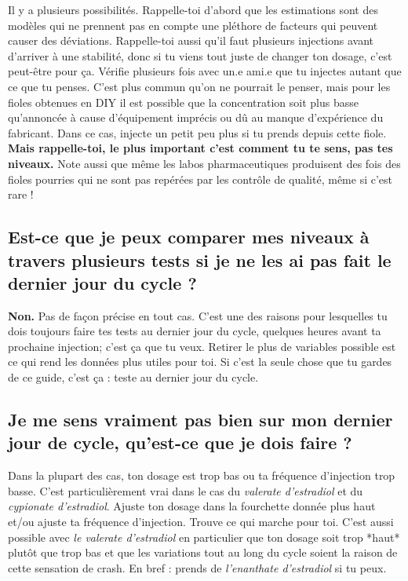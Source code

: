 \documentclass{article}
\begin{document}
Il y a plusieurs possibilités. Rappelle-toi d'abord que les estimations sont des modèles qui ne prennent pas en compte une pléthore de facteurs qui peuvent causer des déviations. Rappelle-toi aussi qu'il faut plusieurs injections avant d'arriver à une stabilité, donc si tu viens tout juste de changer ton dosage, c'est peut-être pour ça. Vérifie plusieurs fois avec un.e ami.e que tu injectes autant que ce que tu penses. C'est plus commun qu'on ne pourrait le penser, mais pour les fioles obtenues en DIY il est possible que la concentration soit plus basse qu'annoncée à cause d'équipement imprécis ou dû au manque d'expérience du fabricant. Dans ce cas, injecte un petit peu plus si tu prends depuis cette fiole. \textbf{Mais rappelle-toi, le plus important c'est comment tu te sens, pas tes niveaux.} Note aussi que même les labos pharmaceutiques produisent des fois des fioles pourries qui ne sont pas repérées par les contrôle de qualité, même si c'est rare ! 

\subsection{Est-ce que je peux comparer mes niveaux à travers plusieurs tests si je ne les ai pas fait le dernier jour du cycle ?}

\textbf{Non.} Pas de façon précise en tout cas. C'est une des raisons pour lesquelles tu dois toujours faire tes tests au dernier jour du cycle, quelques heures avant ta prochaine injection; c'est ça que tu veux. Retirer le plus de variables possible est ce qui rend les données plus utiles pour toi. Si c'est la seule chose que tu gardes de ce guide, c'est ça : teste au dernier jour du cycle.

\subsection{Je me sens vraiment pas bien sur mon dernier jour de cycle, qu'est-ce que je dois faire ?}\label{7-3}

Dans la plupart des cas, ton dosage est trop bas ou ta fréquence d'injection trop basse. C'est particulièrement vrai dans le cas du \textit{valerate d'estradiol} et du \textit{cypionate d'estradiol}. Ajuste ton dosage dans la fourchette donnée plus haut et/ou ajuste ta fréquence d'injection. Trouve ce qui marche pour toi. C'est aussi possible avec \textit{le valerate d'estradiol} en particulier que ton dosage soit trop *haut* plutôt que trop bas et que les variations tout au long du cycle soient la raison de cette sensation de crash. En bref : prends de \textit{l'enanthate d'estradiol} si tu peux.
\end{document}
